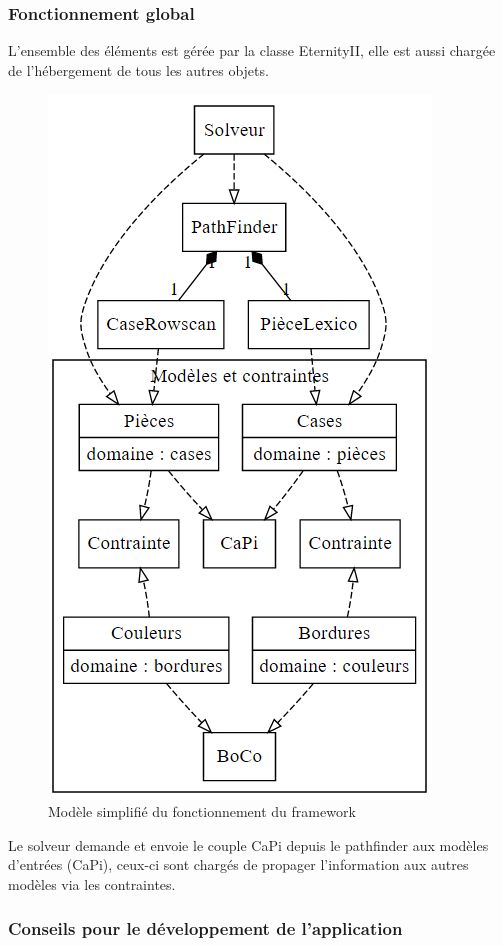 \subsubsection{Fonctionnement global}

L'ensemble des éléments est gérée par la classe EternityII, elle est aussi chargée de l'hébergement de tous les autres objets.

\begin{figure}[H]
\centering
\includegraphics{images/model_simplifie}
\caption{Modèle simplifié du fonctionnement du framework}
\label{fig:model_simplifie}
\end{figure}

Le solveur demande et envoie le couple CaPi depuis le pathfinder aux modèles d'entrées (CaPi), ceux-ci sont chargés de propager l'information aux autres modèles via les contraintes.

\subsubsection{Conseils pour le développement de l'application}

